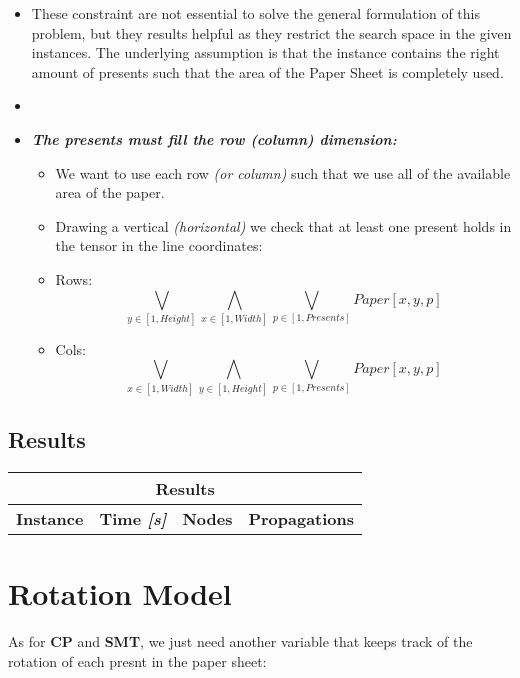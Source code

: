 \begin{itemize}
    \item[] These constraint are not essential to solve the general formulation of this problem,
        but they results helpful as they restrict the search space in the given instances.
        The underlying assumption is that the instance contains the right amount of presents such
        that the area of the Paper Sheet is completely used.
    \item \textbf{\textit{}}
    \item \textbf{\textit{The presents must fill the row (column) dimension:}}
        \begin{itemize}
            \item[] We want to use each row \textit{(or column)} such that we use all of the available area of the paper.
            \item[] Drawing a vertical \textit{(horizontal)} we check that at least one present holds in the tensor in the line coordinates:
            \item[] Rows: \begin{equation*}\bigvee_{y \in [1, Height]} \bigwedge_{x \in [1, Width]} \bigvee_{p \in [1, Presents]} Paper[x, y, p]\end{equation*}
            \item[] Cols: \begin{equation*}\bigvee_{x \in [1, Width]} \bigwedge_{y \in [1, Height]} \bigvee_{p \in [1, Presents]} Paper[x, y, p]\end{equation*}
        \end{itemize}
\end{itemize}

\subsection{Results}
\begin{center}
    \begin{tabular}{|c|c|c|c|}
        \hline
        \multicolumn{4}{|c|}{\textbf{Results}} \\
        \hline
        \textbf{Instance} & \textbf{Time \textit{[s]}} & \textbf{Nodes} & \textbf{Propagations} \\
        \hline
    \end{tabular}
\end{center}

\section{Rotation Model}
As for \textbf{CP} and \textbf{SMT}, we just need another variable that keeps track of the rotation of each presnt in the paper sheet:

